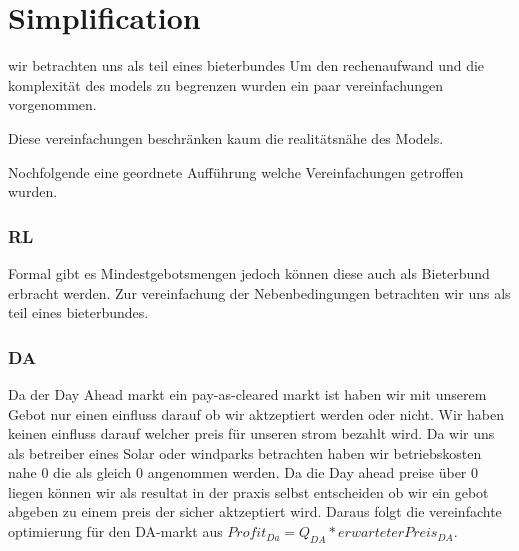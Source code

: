 \section{Simplification}

wir betrachten uns als teil eines bieterbundes
Um den rechenaufwand und die komplexität des models zu begrenzen wurden ein paar vereinfachungen vorgenommen.

Diese vereinfachungen beschränken kaum die realitätsnähe des Models.

Nochfolgende eine geordnete Aufführung welche Vereinfachungen getroffen wurden.
\subsubsection{RL}
Formal gibt es Mindestgebotsmengen jedoch können diese auch als Bieterbund erbracht werden.
Zur vereinfachung der Nebenbedingungen betrachten wir uns als teil eines bieterbundes.

\subsubsection{DA}
Da der Day Ahead markt ein pay-as-cleared markt ist haben wir mit unserem Gebot nur einen einfluss darauf ob wir aktzeptiert werden oder nicht.
Wir haben keinen einfluss darauf welcher preis für unseren strom bezahlt wird.
Da wir uns als betreiber eines Solar oder windparks betrachten haben wir betriebskosten nahe 0 die als gleich 0 angenommen werden.
Da die Day ahead preise über 0 liegen können wir als resultat in der praxis selbst entscheiden ob wir ein gebot abgeben zu einem preis der sicher aktzeptiert wird.
Daraus folgt die vereinfachte optimierung für den DA-markt aus $Profit_{Da} = Q_{DA} * erwarteterPreis_{DA}$.

